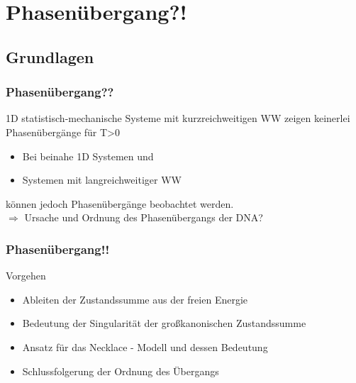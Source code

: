 



\section{Phasenübergang?!}

\subsection{Grundlagen}
 \begin{frame}
\frametitle{Phasenübergang??}
\begin{block}{}
1D statistisch-mechanische Systeme mit kurzreichweitigen WW zeigen keinerlei Phasenübergänge für T>0
\end{block}
\vspace{0.5cm}
\begin{itemize}
\item Bei beinahe 1D Systemen und
\item Systemen mit langreichweitiger WW
\end{itemize}
können jedoch Phasenübergänge beobachtet werden.\\
\vspace{0.5cm}
\centering
$\Rightarrow$ Ursache und Ordnung des Phasenübergangs der DNA?
\end{frame}

\begin{frame}
\frametitle{Phasenübergang!!}
\begin{block}{Vorgehen}
\vspace{0.3cm}
\begin{itemize}
\item Ableiten der Zustandssumme aus der freien Energie
\item Bedeutung der Singularität der großkanonischen Zustandssumme
\item Ansatz für das Necklace - Modell und dessen Bedeutung
\item Schlussfolgerung der Ordnung des Übergangs
\end{itemize}
\end{block}
\end{frame}


